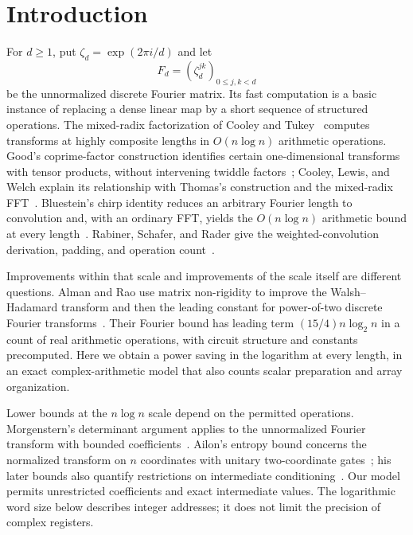 \section{Introduction}

For $d\ge1$, put $\zeta_d=\exp(2\pi i/d)$ and let
\[
 F_d=(\zeta_d^{jk})_{0\le j,k<d}
\]
be the unnormalized discrete Fourier matrix. Its fast computation is a
basic instance of replacing a dense linear map by a short sequence of
structured operations. The mixed-radix factorization of Cooley and
Tukey~\cite{cooleytukey} computes transforms at highly composite lengths
in $O(n\log n)$ arithmetic operations. Good's coprime-factor construction
identifies certain one-dimensional transforms with tensor products,
without intervening twiddle factors~\cite[Sections~11--12]{good1958};
Cooley, Lewis, and Welch explain its relationship with Thomas's
construction and the mixed-radix FFT~\cite{cooleyLewisWelch1967}.
Bluestein's chirp identity reduces an arbitrary Fourier length to
convolution and, with an ordinary FFT, yields the $O(n\log n)$ arithmetic
bound at every length~\cite{bluestein}. Rabiner, Schafer, and Rader give
the weighted-convolution derivation, padding, and operation
count~\cite[Sections~II--III]{rabinerSchaferRader1969}.

Improvements within that scale and improvements of the scale itself
are different questions. Alman and Rao use matrix non-rigidity to
improve the Walsh--Hadamard transform and then the leading constant
for power-of-two discrete Fourier transforms~\cite[Theorem~1.2 and Section~7]{almanrao}. Their
Fourier bound has leading term $(15/4)n\log_2 n$ in a count of real
arithmetic operations, with circuit structure and constants precomputed. Here we
obtain a power saving in the logarithm at every length, in an exact
complex-arithmetic model that also counts scalar preparation and
array organization.

Lower bounds at the $n\log n$ scale depend on the permitted operations.
Morgenstern's determinant argument applies to the unnormalized Fourier
transform with bounded coefficients~\cite{morgenstern}. Ailon's entropy
bound concerns the normalized transform on $n$ coordinates with unitary
two-coordinate gates~\cite[Theorem~2.1]{ailon}; his later bounds also
quantify restrictions on intermediate conditioning~\cite{ailonConditioned}.
Our model permits unrestricted coefficients and exact intermediate
values. The logarithmic word size below describes integer addresses;
it does not limit the precision of complex registers.

